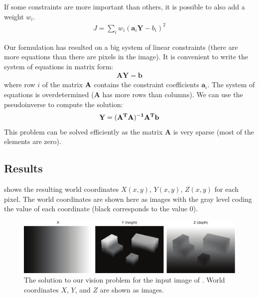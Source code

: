 If some constraints are more important than others, it is possible to also add a weight $w_i$.
\begin{eqnarray}
J = \sum_i w_i (\mathbf{a}_i \mathbf{Y} - b_i)^2
\end{eqnarray}

Our formulation has resulted on a big system of linear constraints (there are more equations than there are pixels in the image). It is convenient to write the system of equations in matrix form:
\begin{eqnarray}
\mathbf{A} \mathbf{Y}  = \mathbf{b}
\end{eqnarray}
where row $i$ of the matrix ${\bf A}$ contains the constraint coefficients $\mathbf{a}_i$. The system of equations is overdetermined ($\mathbf{A}$ has more rows than columns). We can use the pseudoinverse to compute the solution:
\begin{eqnarray}
\bf Y = (\mathbf{A}^T \mathbf{A})^{-1} \mathbf{A}^T \mathbf{b}
\end{eqnarray}
This problem can be solved efficiently as the matrix $\mathbf{A}$ is very sparse (most of the elements are zero).

\subsection{Results}

\Fig{\ref{fig:worldCoordinates}} shows the resulting world coordinates $X(x,y)$, $Y(x,y)$, $Z(x,y)$ for each pixel. The world coordinates are shown here as images with the gray level coding the value of each coordinate (black corresponds to the value 0). 

\begin{figure}[t]
\centerline{
\includegraphics[width=1\linewidth]{figures/simplesystem/worldCoordinates.pdf}
} 
\caption{The solution to our vision problem for the input image of \fig{\ref{fig:edgeLabeling}}.
World coordinates $X$, $Y$, and $Z$ are shown as images.} 
\label{fig:worldCoordinates}
\end{figure}

